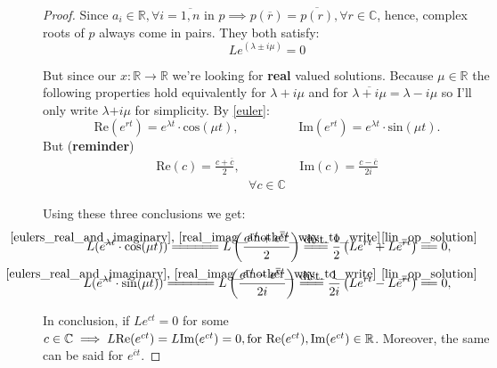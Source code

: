 \begin{proof}
	Since $a_i \in \mathbb{R}, \forall i=\overline{1,n}$ in $p \implies p(\overline{r})=\overline{p(r)}, \forall r \in \mathbb{C}$, hence, complex roots of $p$ always come in pairs. They both satisfy:
	\begin{equation}\label{lin_op_solution}
		Le^{(\lambda \pm i \mu)} = 0
	\end{equation}

	But since our $x : \mathbb{R} \rightarrow \mathbb{R}$ we're looking for \textbf{real} valued solutions.
	Because $\mu \in \mathbb{R}$ the following properties hold equivalently for $\lambda + i\mu$ and for $\overline{\lambda + i\mu}=\lambda - i\mu$ so I'll only write $\lambda \textbf{+} i \mu$ for simplicity. By \ref{euler}:
	\begin{equation}\label{eulers_real_and_imaginary}
		\text{Re}(e^{rt})=e^{\lambda t} \cdot \text{cos}(\mu t), \hspace{2cm}    \text{Im}(e^{rt}) = e^{\lambda t} \cdot \text{sin}(\mu t).
	\end{equation}
	But (\textbf{reminder})
	\begin{gather}\label{real_imag_another_way_to_write}
		\text{Re}(c)= \frac{c+\overline{c}}{2}, \hspace{2cm}
		\text{Im}(c) = \frac{c-\overline{c}}{2i}
	\end{gather}
	\begin{gather*}
		\forall c \in \mathbb{C}
	\end{gather*}

	\newcommand\firstConclusion{\stackrel{\mathclap{\normalfont\mbox{\ref{eulers_real_and_imaginary}, \ref{real_imag_another_way_to_write}}}}{=\joinrel=\joinrel=\joinrel=\joinrel=\joinrel=}}

	\newcommand\byDistributivity{\stackrel{\mathclap{\normalfont\mbox{dist.}}}{=\joinrel=\joinrel=}}

	\newcommand\operatorSatisfy{\stackrel{\mathclap{\normalfont\mbox{\ref{lin_op_solution}}}}{=\joinrel=}}

	Using these three conclusions we get:
	\begin{align*}
		L(e^{\lambda t} \cdot \text{cos}(\mu t)) \firstConclusion
		L\left(\frac{e^{rt}+e^{\overline{r}t}}{2} \right) \byDistributivity
		\frac{1}{2} \left( Le^{rt} + Le^{\overline{r}t} \right) \operatorSatisfy 0 , \\
		L(e^{\lambda t} \cdot \text{sin}(\mu t)) \firstConclusion
		L\left(\frac{e^{rt}-e^{\overline{r}t}}{2i} \right) \byDistributivity
		\frac{1}{2i} \left( Le^{rt} - Le^{\overline{r}t} \right) \operatorSatisfy 0 ,
	\end{align*}

	In conclusion, if $Le^{ct}=0$ for some $c \in \mathbb{C} \implies L\text{Re}(e^{ ct })= L\text{Im}(e^{ct})=0, \\
	\text{for } \text{Re}(e^{ct}), \text{Im}(e^{ct}) \in \mathbb{R}$.
	Moreover, the same can be said for $e^{\overline{c}t}$.
\end{proof}

